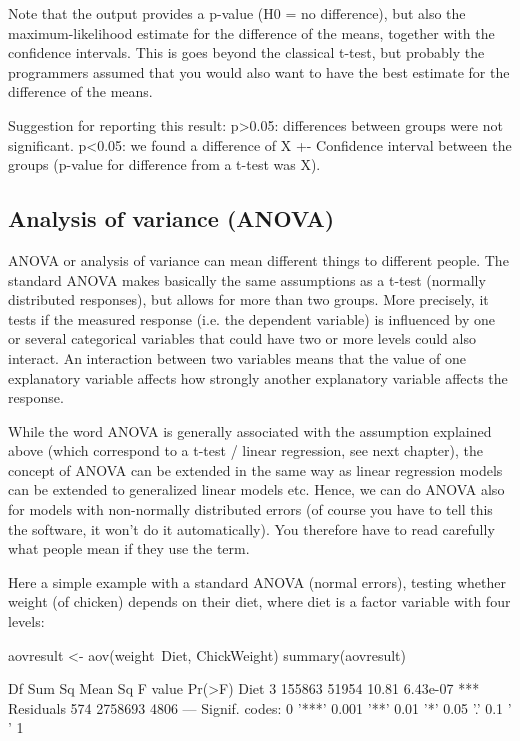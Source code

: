 \documentclass[a4paper,twoside]{tufte-book}\usepackage[]{graphicx}\usepackage[]{color}
\begin{document}
{Note that the output provides a p-value (H0 = no difference), but also the maximum-likelihood estimate for the difference of the means, together with the confidence intervals. This is goes beyond the classical t-test, but probably the programmers assumed that you would also want to have the best estimate for the difference of the means.

Suggestion for reporting this result: p>0.05: differences between groups were not significant. p<0.05: we found a difference of X +- Confidence interval between the groups (p-value for difference from a t-test was X). 

\subsection{Analysis of variance (ANOVA)}

ANOVA or analysis of variance can mean different things to different people. The standard ANOVA makes basically the same assumptions as a t-test (normally distributed responses), but allows for more than two groups. More precisely, it tests if the measured response (i.e. the dependent variable) is influenced by one or several categorical variables that could have two or more levels could also interact. An interaction between two variables means that the value of one explanatory variable affects how strongly another explanatory variable affects the response.

While the word ANOVA is generally associated with the assumption explained above (which correspond to a t-test / linear regression, see next chapter), the concept of ANOVA can be extended in the same way as linear regression models can be extended to generalized linear models etc. Hence, we can do ANOVA also for models with non-normally distributed errors (of course you have to tell this the software, it won't do it automatically). You therefore have to read carefully what people mean if they use the term.

Here a simple example with a standard ANOVA (normal errors), testing whether weight (of chicken) depends on their diet, where diet is a factor variable with four levels:

\begin{Schunk}
\begin{Sinput}
aovresult <- aov(weight~Diet, ChickWeight)
summary(aovresult)
\end{Sinput}
\begin{Soutput}
             Df  Sum Sq Mean Sq F value   Pr(>F)    
Diet          3  155863   51954   10.81 6.43e-07 ***
Residuals   574 2758693    4806                     
---
Signif. codes:  0 '***' 0.001 '**' 0.01 '*' 0.05 '.' 0.1 ' ' 1
\end{Soutput}
\end{Schunk}

}
\end{document}
